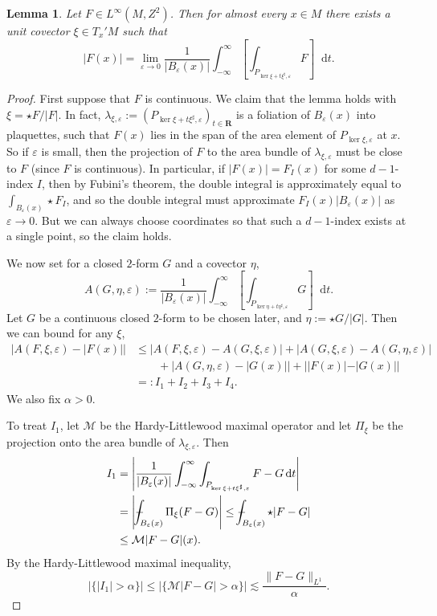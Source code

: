 \documentclass[reqno,11pt]{amsart}
\newcommand{\RR}{\mathbf{R}}
\newcommand*\dif{\mathop{}\!\mathrm{d}}
\newtheorem{lemma}[theorem]{Lemma}
\theoremstyle{definition}
\numberwithin{equation}{section}
\def\Xint#1{\mathchoice
{\XXint\displaystyle\textstyle{#1}}%
{\XXint\textstyle\scriptstyle{#1}}%
{\XXint\scriptstyle\scriptscriptstyle{#1}}%
{\XXint\scriptscriptstyle\scriptscriptstyle{#1}}%
\!\int}
\def\XXint#1#2#3{{\setbox0=\hbox{$#1{#2#3}{\int}$ }
\vcenter{\hbox{$#2#3$ }}\kern-.6\wd0}}
\def\dashint{\Xint-}
\begin{document}
\begin{lemma}
Let $F \in L^\infty(M, Z^2)$.
Then for almost every $x \in M$ there exists a unit covector $\xi \in T_x' M$ such that
$$|F(x)| = \lim_{\varepsilon \to 0} \frac{1}{|B_\varepsilon(x)|} \int_{-\infty}^\infty \left[\int_{P_{\ker \xi + t\xi^\sharp, \varepsilon}} F\right] \dif t.$$
\end{lemma}
\begin{proof}
First suppose that $F$ is continuous. We claim that the lemma holds with $\xi = \star F/|F|$.
In fact, $\lambda_{\xi, \varepsilon} := (P_{\ker \xi + t\xi^\sharp, \varepsilon})_{t \in \RR}$ is a foliation of $B_\varepsilon(x)$ into plaquettes, such that $F(x)$ lies in the span of the area element of $P_{\ker \xi, \varepsilon}$ at $x$.
So if $\varepsilon$ is small, then the projection of $F$ to the area bundle of $\lambda_{\xi, \varepsilon}$ must be close to $F$ (since $F$ is continuous).
In particular, if $|F(x)| = F_I(x)$ for some $d-1$-index $I$, then by Fubini's theorem, the double integral is approximately equal to $\int_{B_\varepsilon(x)} \star F_I$, and so the double integral must approximate $F_I(x) |B_\varepsilon(x)|$ as $\varepsilon \to 0$.
But we can always choose coordinates so that such a $d-1$-index exists at a single point, so the claim holds.

We now set for a closed $2$-form $G$ and a covector $\eta$,
$$A(G, \eta, \varepsilon) := \frac{1}{|B_\varepsilon(x)|} \int_{-\infty}^\infty \left[\int_{P_{\ker \eta + t\eta^\sharp, \varepsilon}} G\right] \dif t.$$
Let $G$ be a continuous closed $2$-form to be chosen later, and $\eta := \star G/|G|$.
Then we can bound for any $\xi$,
\begin{align*}
|A(F, \xi, \varepsilon) - |F(x)||
&\leq |A(F, \xi, \varepsilon) - A(G, \xi, \varepsilon)| + |A(G, \xi, \varepsilon) - A(G, \eta, \varepsilon)| \\
&\qquad + |A(G, \eta, \varepsilon) - |G(x)|| + ||F(x)| - |G(x)||\\
&=: I_1 + I_2 + I_3 + I_4.
\end{align*}
We also fix $\alpha > 0$.

To treat $I_1$, let $\mathcal M$ be the Hardy-Littlewood maximal operator and let $\Pi_\xi$ be the projection onto the area bundle of $\lambda_{\xi, \varepsilon}$.
Then 
\begin{align*}
I_1
&= \left|\frac{1}{|B_\varepsilon(x)|} \int_{-\infty}^\infty \int_{P_{\ker \xi + t\xi^\sharp, \varepsilon}} F - G \dif t\right| \\
&= \left|\dashint_{B_\varepsilon(x)} \Pi_\xi(F - G)\right| \leq \dashint_{B_\varepsilon(x)} \star |F - G| \\
&\leq \mathcal M|F-G|(x).
\end{align*}
By the Hardy-Littlewood maximal inequality, 
$$|\{|I_1| > \alpha\}| \leq |\{\mathcal M |F - G| > \alpha\}| \lesssim \frac{\|F - G\|_{L^1}}{\alpha}.$$


\end{proof}
\end{document}

